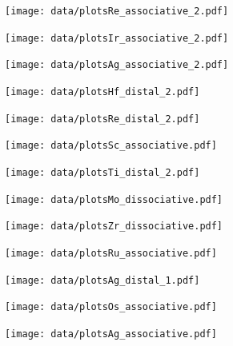 \begin{figure}
\centering
\texttt{[image: data/plotsRe\_associative\_2.pdf]}
\end{figure}

\begin{figure}
\centering
\texttt{[image: data/plotsIr\_associative\_2.pdf]}
\end{figure}

\begin{figure}
\centering
\texttt{[image: data/plotsAg\_associative\_2.pdf]}
\end{figure}

\begin{figure}
\centering
\texttt{[image: data/plotsHf\_distal\_2.pdf]}
\end{figure}

\begin{figure}
\centering
\texttt{[image: data/plotsRe\_distal\_2.pdf]}
\end{figure}

\begin{figure}
\centering
\texttt{[image: data/plotsSc\_associative.pdf]}
\end{figure}

\begin{figure}
\centering
\texttt{[image: data/plotsTi\_distal\_2.pdf]}
\end{figure}

\begin{figure}
\centering
\texttt{[image: data/plotsMo\_dissociative.pdf]}
\end{figure}

\begin{figure}
\centering
\texttt{[image: data/plotsZr\_dissociative.pdf]}
\end{figure}

\begin{figure}
\centering
\texttt{[image: data/plotsRu\_associative.pdf]}
\end{figure}

\begin{figure}
\centering
\texttt{[image: data/plotsAg\_distal\_1.pdf]}
\end{figure}

\begin{figure}
\centering
\texttt{[image: data/plotsOs\_associative.pdf]}
\end{figure}

\begin{figure}
\centering
\texttt{[image: data/plotsAg\_associative.pdf]}
\end{figure}

